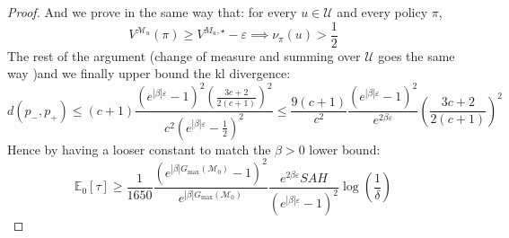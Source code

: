 \documentclass[final,12pt]{colt2026} %
\begin{document}
\begin{proof}
And we prove in the same way that:
 for every $u \in \mathcal{U}$ and every policy $\pi$,
$$V^{\mathcal{M}_u}(\pi) \geq V^{M_u, \star} - \varepsilon \implies \nu_{\pi}(u) > \frac{1}{2}$$
The rest of the argument (change of measure and summing over $\mathcal{U}$ goes the same way )and we finally upper bound the kl divergence:
$$d(p_-, p_+) \leq (c+1)  \frac{(e^{|\beta| \varepsilon} - 1)^2 \left(\frac{3c+2}{2(c+1)}\right)^2}{c^2(e^{|\beta| \varepsilon} -\frac{1}{2})^2} \leq \frac{9(c+1)}{c^2}  \frac{(e^{|\beta| \varepsilon} - 1)^2}{e^{2\beta \varepsilon}}  \left(\frac{3c+2}{2(c+1)}\right)^2$$
Hence by having a looser constant to match the $\beta>0$ lower bound:
$$\mathbb{E}_0[\tau] \geq \frac{1}{1650} \frac{\left(e^{|\beta| G_{\max}(\mathcal{M}_0)}- 1\right)^2}{e^{|\beta| G_{\max}(\mathcal{M}_0)}} \frac{e^{2\beta \varepsilon}SAH}{(e^{|\beta| \varepsilon} - 1)^2} \log\left(\frac{1}{\delta}\right)$$
\end{proof}
\end{document}
